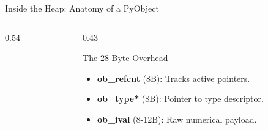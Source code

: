 \begin{frame}{Inside the Heap: Anatomy of a PyObject}
  \begin{columns}[c,onlytextwidth]
    \begin{column}{0.54\textwidth}
    \end{column}
    \begin{column}{0.43\textwidth}
      \begin{ConceptBox}{The 28-Byte Overhead}
        \scriptsize
        \begin{itemize}\setlength{\itemsep}{0.05cm}
          \item \textbf{ob\_refcnt} (8B): Tracks active pointers.
          \item \textbf{ob\_type*} (8B): Pointer to type descriptor.
          \item \textbf{ob\_ival} (8-12B): Raw numerical payload.
        \end{itemize}
      \end{ConceptBox}
      \vspace{0.06cm}
    \end{column}
  \end{columns}
\end{frame}

